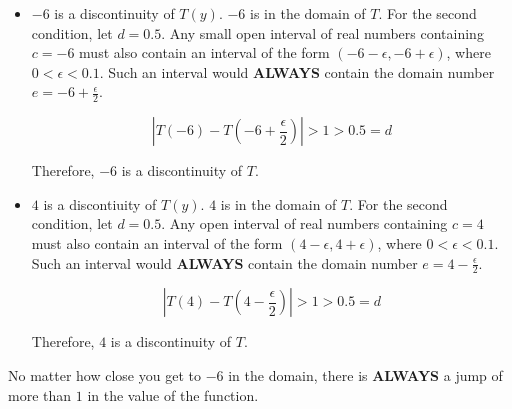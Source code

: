 \documentclass{ximera}
\begin{document}
\begin{example}
\begin{itemize}
\item $-6$ is a discontinuity of $T(y)$.  $-6$ is in the domain of $T$.  For the second condition, let $d = 0.5$. Any small open interval of real numbers containing $c = -6$ must also contain an interval of the form $(-6-\epsilon, -6+\epsilon)$, where $0 < \epsilon < 0.1$.   Such an interval would \textbf{ALWAYS} contain the domain number $e = -6+\frac{\epsilon}{2}$.

\[ \left| T(-6) - T\left(-6+\frac{\epsilon}{2}\right) \right| > 1 > 0.5 = d \]

Therefore, $-6$ is a discontinuity of $T$. 


\item $4$ is a discontiuity of $T(y)$.   $4$ is in the domain of $T$.  For the second condition, let $d = 0.5$. Any open interval of real numbers containing $c = 4$ must also contain an interval of the form $(4-\epsilon, 4+\epsilon)$, where $0 < \epsilon < 0.1$.   Such an interval would \textbf{ALWAYS} contain the domain number $e = 4-\frac{\epsilon}{2}$.

\[ \left| T(4) - T\left(4-\frac{\epsilon}{2}\right) \right| > 1 > 0.5 = d \]

Therefore, $4$ is a discontinuity of $T$. 

\end{itemize}



\end{example}

No matter how close you get to $-6$ in the domain, there is \textbf{ALWAYS} a jump of more than $1$ in the value of the function.  
\end{document}
